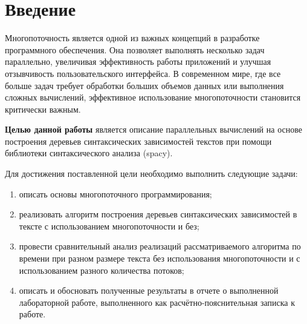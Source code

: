\chapter*{Введение}

Многопоточность является одной из важных концепций в разработке программного обеспечения. Она позволяет выполнять несколько задач параллельно, увеличивая эффективность работы приложений и улучшая отзывчивость пользовательского интерфейса. В современном мире, где все больше задач требует обработки больших объемов данных или выполнения сложных вычислений, эффективное использование многопоточности становится критически важным.

\textbf{Целью данной работы} является описание параллельных вычислений на основе построения деревьев синтаксических зависимостей текстов при помощи библиотеки синтаксического анализа (spacy).

Для достижения поставленной цели необходимо выполнить следующие задачи:
\begin{enumerate}[label=\arabic*)]
	\item описать основы многопоточного программирования;
    \item реализовать алгоритм построения деревьев синтаксических зависимостей в тексте с использованием многопоточности и без;
    \item провести сравнительный анализ реализаций рассматриваемого алгоритма по времени при разном размере текста без использования многопоточности и с использованием разного количества потоков;
	\item описать и обосновать полученные результаты в отчете о выполненной лабораторной работе, выполненного как расчётно-пояснительная записка к работе.
\end{enumerate}
